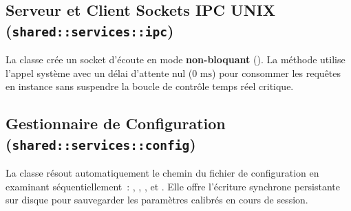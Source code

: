 \subsection{Serveur et Client Sockets IPC UNIX (\texttt{shared::services::ipc})}
La classe  crée un socket d'écoute  en mode \textbf{non-bloquant} (). La méthode  utilise l'appel système  avec un délai d'attente nul ($0\text{ ms}$) pour consommer les requêtes en instance sans suspendre la boucle de contrôle temps réel critique.

\subsection{Gestionnaire de Configuration (\texttt{shared::services::config})}
La classe  résout automatiquement le chemin du fichier de configuration en examinant séquentiellement~: , , ,  et . Elle offre l'écriture synchrone persistante sur disque pour sauvegarder les paramètres calibrés en cours de session.
